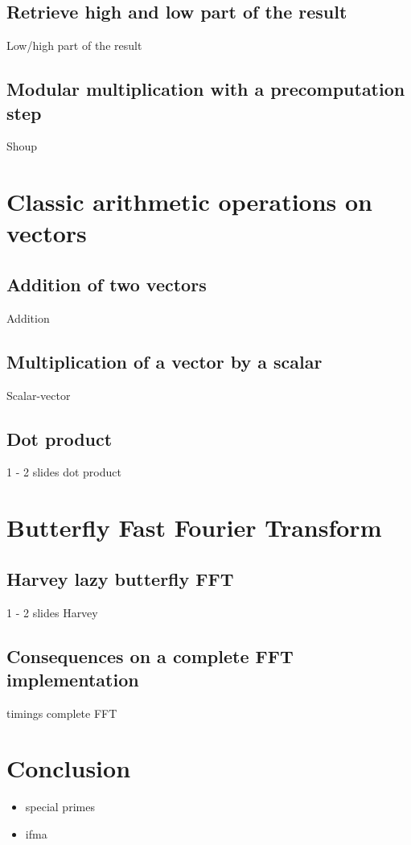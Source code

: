 \documentclass{beamer}
\begin{document}
\subsection{Retrieve high and low part of the result}
\begin{frame}
    Low/high part of the result
\end{frame}

\subsection{Modular multiplication with a precomputation step}
\begin{frame}
    Shoup
\end{frame}

\section{Classic arithmetic operations on vectors}
\subsection{Addition of two vectors}
\begin{frame}
    Addition
\end{frame}

\subsection{Multiplication of a vector by a scalar}
\begin{frame}
    Scalar-vector
\end{frame}

\subsection{Dot product}
\begin{frame}
    1 - 2 slides
    dot product
\end{frame}

\section{Butterfly Fast Fourier Transform}
\subsection{Harvey lazy butterfly FFT}
\begin{frame}
    1 - 2 slides
    Harvey
\end{frame}

\subsection{Consequences on a complete FFT implementation}
\begin{frame}
    timings complete FFT
\end{frame}

\section{Conclusion}
\begin{frame}
    \begin{itemize}
        \item special primes
        \item ifma
    \end{itemize}
\end{frame}
\end{document}
